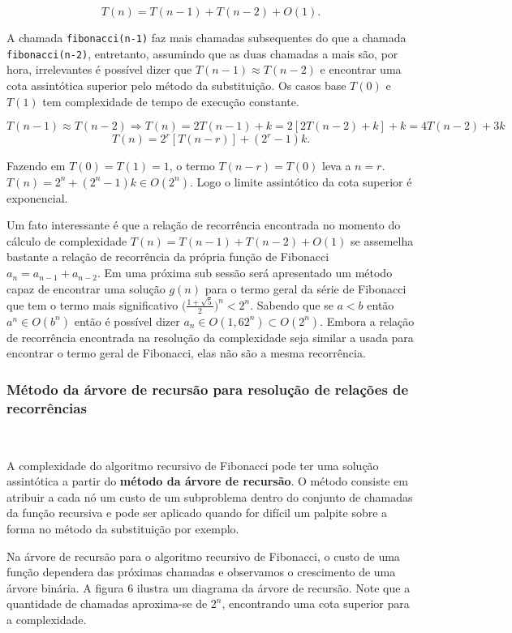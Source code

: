 \[T(n) = T(n-1) + T(n-2) + O(1).\]

A chamada \texttt{fibonacci(n-1)} faz mais chamadas subsequentes do que a chamada \texttt{fibonacci(n-2)}, entretanto, assumindo que as duas chamadas a mais são, por hora, irrelevantes é possível dizer que $T(n-1)\approx T(n-2)$ e encontrar uma cota assintótica superior pelo método da substituição. Os casos base $T(0)$ e $T(1)$ tem complexidade de tempo de execução constante.

\[T(n-1)\approx T(n-2) \Rightarrow T(n) = 2T(n-1) + k = 2[2T(n-2)+k]+k = 4T(n-2) + 3k\]
\[T(n) = 2^r[T(n-r)]+(2^{r}-1)k.\]

Fazendo em $T(0)=T(1)=1$, o termo $T(n-r)=T(0)$ leva a $n=r$. $T(n) = 2^n + (2^n-1)k \in O(2^n)$. Logo o limite assintótico da cota superior é exponencial.

Um fato interessante é que a relação de recorrência encontrada no momento do cálculo de complexidade $T(n)=T(n-1)+T(n-2)+O(1)$ se assemelha bastante a relação de recorrência da própria função de Fibonacci $a_n=a_{n-1}+a_{n-2}$. Em uma próxima sub sessão será apresentado um método capaz de encontrar uma solução $g(n)$ para o termo geral da série de Fibonacci que tem o termo mais significativo $\Bigr(\frac{1+\sqrt{5}}{2}\Bigr)^n < 2^n$. Sabendo que se $a<b$ então $a^n \in O(b^n)$ então é possível dizer $a_n \in O(1,62^n) \subset O(2^n)$. Embora a relação de recorrência encontrada na resolução da complexidade seja similar a usada para encontrar o termo geral de Fibonacci, elas não são a mesma recorrência.

\subsubsection{Método da árvore de recursão para resolução de relações de recorrências}
\

A complexidade do algoritmo recursivo de Fibonacci pode ter uma solução assintótica a partir do \textbf{método da árvore de recursão}. O método consiste em atribuir a cada nó um custo de um subproblema dentro do conjunto de chamadas da função recursiva e pode ser aplicado quando for difícil um palpite sobre a forma no método da substituição por exemplo.

Na árvore de recursão para o algoritmo recursivo de Fibonacci, o custo de uma função dependera das próximas chamadas e observamos o crescimento de uma árvore binária. A figura 6 ilustra um diagrama da árvore de recursão. Note que a quantidade de chamadas aproxima-se de $2^n$, encontrando uma cota superior para a complexidade.

